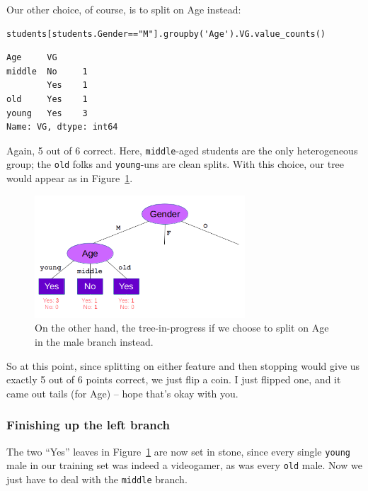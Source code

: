 \begin{samepage}
Our other choice, of course, is to split on \textsf{Age} instead:

\begin{Verbatim}[fontsize=\small,samepage=true,frame=single,framesep=3mm]
students[students.Gender=="M"].groupby('Age').VG.value_counts()
\end{Verbatim}
\vspace{-.2in}
\end{samepage}

\begin{Verbatim}[fontsize=\small,samepage=true,frame=leftline,framesep=5mm,framerule=1mm]
Age     VG 
middle  No     1
        Yes    1
old     Yes    1
young   Yes    3
Name: VG, dtype: int64
\end{Verbatim}

Again, 5 out of 6 correct. Here, \texttt{middle}-aged students are the only
heterogeneous group; the \texttt{old} folks and \texttt{young}-uns are clean
splits. With this choice, our tree would appear as in
Figure~\ref{fig:maleAgeSplit}.

\begin{figure}[ht]
\centering
\includegraphics[width=0.7\textwidth]{maleAgeSplit.png}
\caption{On the other hand, the tree-in-progress if we choose to split on
\textsf{Age} in the male branch instead.}
\label{fig:maleAgeSplit}
\end{figure}

So at this point, since splitting on either feature and then stopping would
give us exactly 5 out of 6 points correct, we just flip a coin. I just flipped
one, and it came out tails (for \textsf{Age}) -- hope that's okay with you.

\subsubsection{Finishing up the left branch}

The two ``Yes'' leaves in Figure~\ref{fig:maleAgeSplit} are now set in stone,
since every single \texttt{young} male in our training set was indeed a
videogamer, as was every \texttt{old} male. Now we just have to deal with the
\texttt{middle} branch.

